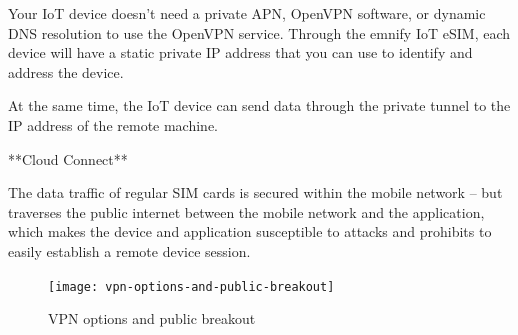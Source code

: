 \documentclass[11pt, oneside]{article}   	%
\newcommand{\addspace}{\vspace{2mm}}
\newcommand{\removespace}{\vspace{-7mm}}
\begin{document}
\begin{markdown}
Your IoT device doesn't need a private APN, OpenVPN software, or dynamic DNS resolution to use the OpenVPN service.
Through the emnify IoT eSIM, each device will have a static private IP address that you can use to identify and address the device.

At the same time, the IoT device can send data through the private tunnel to the IP address of the remote machine.

**Cloud Connect**

The data traffic of regular SIM cards is secured within the mobile network -- but traverses the public internet between the mobile network and the application, which makes the device and application susceptible to attacks and prohibits to easily establish a remote device session.

\end{markdown}
\addspace
\begin{figure}[h]
  \texttt{[image: vpn-options-and-public-breakout]}
  \removespace
  \caption{VPN options and public breakout}
\end{figure}
\addspace
\end{document}
